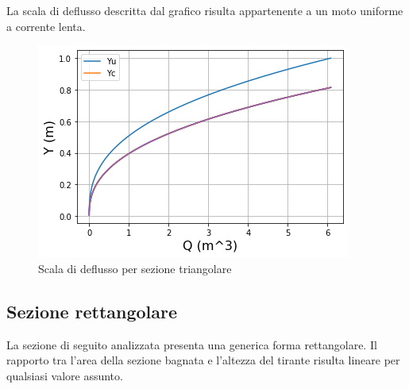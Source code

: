 \documentclass[12pt]{article} %
\begin{document}
\newpage

\noindent La scala di deflusso descritta dal grafico risulta appartenente a un moto uniforme a corrente lenta. 

\begin{figure}[H]
    \centering
    \includegraphics[scale=0.8]{deflussotri.png}
    \caption{Scala di deflusso per sezione triangolare}
    \label{fig:triangolare_scala_deflusso}
\end{figure}


\subsection{Sezione rettangolare}

\noindent La sezione di seguito analizzata presenta una generica forma rettangolare.
Il rapporto tra l’area della sezione bagnata e l’altezza del tirante risulta lineare per qualsiasi valore assunto.
\end{document}
